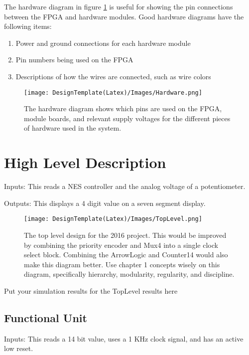 \documentclass[a4paper]{article}
\begin{document}
\vspace{.25in}
The hardware diagram in figure \ref{fig:Hardware} is useful for showing the pin connections between the FPGA and hardware modules.  Good hardware diagrams have the following items:
\begin{enumerate}
\item Power and ground connections for each hardware module
\item Pin numbers being used on the FPGA
\item Descriptions of how the wires are connected, such as wire colors
\end{enumerate}

\begin{figure}[h]
  \centering
    \texttt{[image: DesignTemplate(Latex)/Images/Hardware.png]}
	\caption{The hardware diagram shows which pins are used on the FPGA, module boards, and relevant supply voltages for the different pieces of hardware used in the system.}
    \label{fig:Hardware}
\end{figure}


\newpage
\section{High Level Description}
Inputs:  This reads a NES controller and the analog voltage of a potentiometer.

Outputs:  This displays a 4 digit value on a seven segment display.

\begin{figure}[h]
  \centering
    \texttt{[image: DesignTemplate(Latex)/Images/TopLevel.png]}
	\caption{The top level design for the 2016 project.  This would be improved by combining the priority encoder and Mux4 into a single clock select block.  Combining the ArrowLogic and Counter14 would also make this diagram better.  Use chapter 1 concepts wisely on this diagram, specifically hierarchy, modularity, regularity, and discipline.}
    \label{fig:TopLevelDiagram}
\end{figure}

\vspace{.25 in}

Put your simulation results for the TopLevel results here

\subsection{Functional Unit}
Inputs:  This reads a 14 bit value, uses a 1 KHz clock signal, and has an active low reset.\newline
\end{document}
